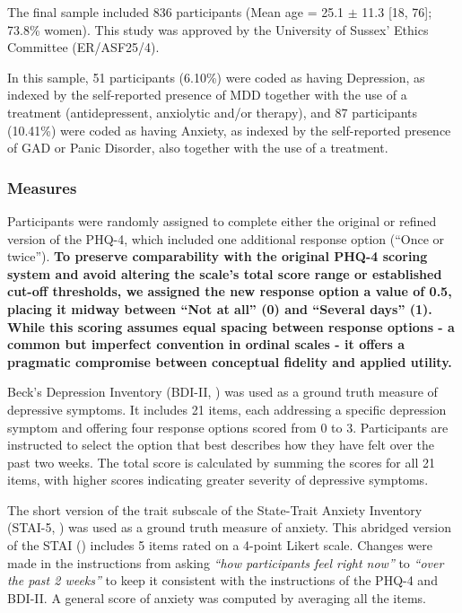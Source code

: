 \documentclass[
  jou,
  longtable,
  nolmodern,
  notxfonts,
  notimes,
  mask,
  colorlinks=true,linkcolor=blue,citecolor=blue,urlcolor=blue]{apa7}
\begin{document}
The final sample included 836 participants (Mean age = 25.1 \(\pm\) 11.3
{[}18, 76{]}; 73.8\% women). This study was approved by the University
of Sussex' Ethics Committee (ER/ASF25/4).

In this sample, 51 participants (6.10\%) were coded as having
Depression, as indexed by the self-reported presence of MDD together
with the use of a treatment (antidepressent, anxiolytic and/or therapy),
and 87 participants (10.41\%) were coded as having Anxiety, as indexed
by the self-reported presence of GAD or Panic Disorder, also together
with the use of a treatment.

\subsubsection{Measures}\label{measures-1}

Participants were randomly assigned to complete either the original or
refined version of the PHQ-4, which included one additional response
option (``Once or twice''). \textbf{To preserve comparability with the
original PHQ-4 scoring system and avoid altering the scale's total score
range or established cut-off thresholds, we assigned the new response
option a value of 0.5, placing it midway between ``Not at all'' (0) and
``Several days'' (1). While this scoring assumes equal spacing between
response options - a common but imperfect convention in ordinal scales -
it offers a pragmatic compromise between conceptual fidelity and applied
utility.}

Beck's Depression Inventory (BDI-II, ) was used as a ground truth measure of depressive symptoms.
It includes 21 items, each addressing a specific depression symptom and
offering four response options scored from 0 to 3. Participants are
instructed to select the option that best describes how they have felt
over the past two weeks. The total score is calculated by summing the
scores for all 21 items, with higher scores indicating greater severity
of depressive symptoms.

The short version of the trait subscale of the State-Trait Anxiety
Inventory (STAI-5, ) was used as a ground truth measure of anxiety. This abridged
version of the STAI () includes 5 items rated on a 4-point Likert scale. Changes were
made in the instructions from asking \emph{``how participants feel right
now''} to \emph{``over the past 2 weeks''} to keep it consistent with
the instructions of the PHQ-4 and BDI-II. A general score of anxiety was
computed by averaging all the items.
\end{document}

